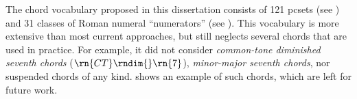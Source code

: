 
The chord vocabulary proposed in this dissertation consists
of 121 \gls{pcset}s (see
) and 31 classes of
Roman numeral ``numerators'' (see
). This
vocabulary is more extensive than most current approaches,
but still neglects several chords that are used in practice.
For example, it did not consider
\emph{common-tone diminished seventh chords}
($\rn{CT}\rndim{}\rn{7}$), \emph{minor-major seventh
chords}, nor suspended chords of any kind.
 shows an example of such
chords, which are left for future work.

